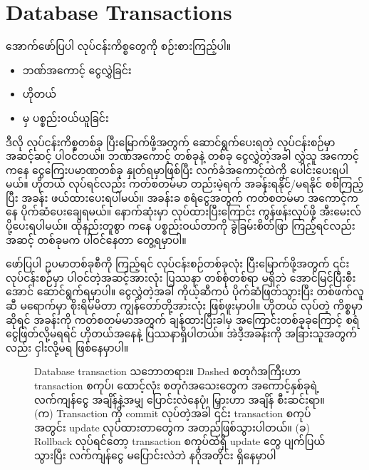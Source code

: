 \section{Database Transactions}
အောက်ဖော်ပြပါ လုပ်ငန်းကိစ္စတွေကို စဉ်းစားကြည့်ပါ။
%
\begin{itemize}
    \item ဘဏ်အကောင့် ငွေလွှဲခြင်း
    \item ဟိုတယ် 
    \item {} မှ ပစ္စည်းဝယ်ယူခြင်း
\end{itemize}
%
ဒီလို လုပ်ငန်းကိစ္စတစ်ခု ပြီးမြောက်ဖို့အတွက် ဆောင်ရွက်ပေးရတဲ့ လုပ်ငန်းစဉ်မှာ အဆင့်ဆင့် ပါဝင်တယ်။ ဘဏ်အကောင့် တစ်ခုနဲ့ တစ်ခု ငွေလွှဲတဲ့အခါ လွှဲသူ အကောင့်ကနေ ငွေကြေးပမာဏတစ်ခု နှုတ်ရမှာဖြစ်ပြီး လက်ခံအကောင့်ထဲကို ပေါင်းပေးရပါမယ်။ ဟိုတယ်   လုပ်ရင်လည်း ကတ်စတမ်မာ တည်းမဲ့ရက် အခန်းရနိုင်/မရနိုင် စစ်ကြည့်ပြီး အခန်း ဖယ်ထားပေးရပါမယ်။ အခန်းခ စရံငွေအတွက် ကတ်စတမ်မာ အကောင့်ကနေ ပိုက်ဆံပေးချေရမယ်။ နောက်ဆုံးမှာ  လုပ်ထားပြီးကြောင်း ကွန်ဖန်းလုပ်ဖို့ အီးမေးလ်ပို့ပေးရပါမယ်။ ထိုနည်းတူစွာ  ကနေ ပစ္စည်းဝယ်တာကို ခွဲခြမ်းစိတ်ဖြာ ကြည့်ရင်လည်း အဆင့် တစ်ခုမက ပါဝင်နေတာ တွေ့ရမှာပါ။

ဖော်ပြပါ ဥပမာတစ်ခုစီကို ကြည့်ရင် လုပ်ငန်းစဉ်တစ်ခုလုံး  ပြီးမြောက်ဖို့အတွက် ၎င်းလုပ်ငန်းစဉ်မှာ ပါဝင်တဲ့အဆင့်အားလုံး ပြဿနာ တစ်စုံ\allowbreak တစ်ရာ မရှိဘဲ အောင်မြင်ပြီးစီးအောင် ဆောင်ရွက်ရမှာပါ။ ငွေလွှဲတဲ့အခါ ကိုယ့်ဆီကပဲ ပိုက်ဆံဖြတ်သွားပြီး တစ်ဖက်လူဆီ မရောက်မှာ စိုးရိမ်မိတာ ကျွန်တော်တို့အားလုံး ဖြစ်ဖူးမှာပါ။ ဟိုတယ်  လုပ်တဲ့ ကိစ္စမှာဆိုရင် အခန်းကို ကတ်စတမ်မာအတွက် ချန်ထားပြီးခါမှ အကြောင်းတစ်ခုခုကြောင့် စရံငွေဖြတ်လို့မရရင် ဟိုတယ်အနေနဲ့ ပြဿနာရှိပါတယ်။ အဲဒီ့အခန်းကို အခြားသူအတွက်လည်း ငှါးလို့မရ ဖြစ်နေမှာပါ။ 

\begin{figure}[thb!]%
\hfill%
\vspace{1\baselineskip}
%
\caption{Database transaction သဘောတရား။ Dashed စတုဂံအကြီးဟာ transaction စကုပ်၊ ထောင့်လုံး စတုဂံအသေးတွေက အကောင့်နှစ်ခုရဲ့ လက်ကျန်ငွေ အချိန်နဲ့အမျှ ပြောင်းလဲနေပုံ၊ မြှားဟာ အချိန် စီးဆင်းရာ။   (က) Transaction ကို commit လုပ်တဲ့အခါ ၎င်း transaction စကုပ် အတွင်း update လုပ်ထားတာတွေက အတည်ဖြစ်သွားပါတယ်။ (ခ) Rollback လုပ်ရင်တော့ transaction စကုပ်ထဲရှိ update တွေ ပျက်ပြယ်သွားပြီး လက်ကျန်ငွေ မပြောင်းလဲဘဲ နဂိုအတိုင်း ရှိနေမှာပါ}
\label{fig:txn_commit_rollback}
\end{figure}

